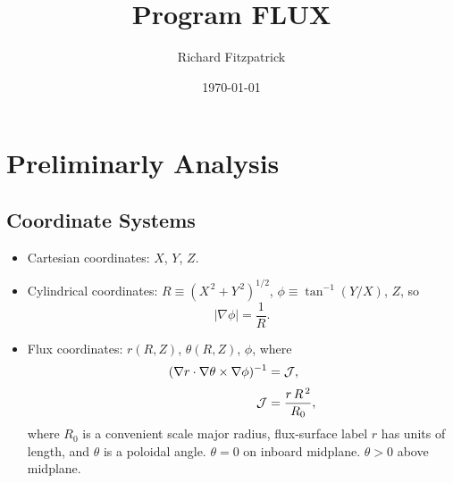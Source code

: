 \documentclass[12pt]{article}
\title{\bf Program FLUX}
\date{\today}
\author{Richard Fitzpatrick}
\begin{document}
\maketitle

\section{Preliminarly Analysis}
\subsection{Coordinate Systems}
\begin{itemize}
\item Cartesian coordinates: $X$, $Y$, $Z$.
\item Cylindrical coordinates: $R\equiv (X^{\,2}+Y^{\,2})^{1/2}$, $\phi\equiv \tan^{-1}(Y/X)$, $Z$,
so
\begin{equation}
|\nabla\phi| = \frac{1}{R}.
\end{equation}
\item Flux coordinates: $r(R,Z)$, $\theta(R,Z)$, $\phi$, where
\begin{align}\label{e1}
(\nabla r\cdot\nabla\theta\times \nabla\phi)^{-1} &= {\cal J},\\[0.5ex]
{\cal J} &=\frac{r\,R^{\,2}}{R_0},\label{e2}
\end{align}
where $R_0$ is a convenient scale major radius, flux-surface label $r$ has units of length, and $\theta$ is
a poloidal angle. $\theta=0$ on inboard midplane. $\theta>0$ above midplane. 
\end{itemize}
\end{document}

